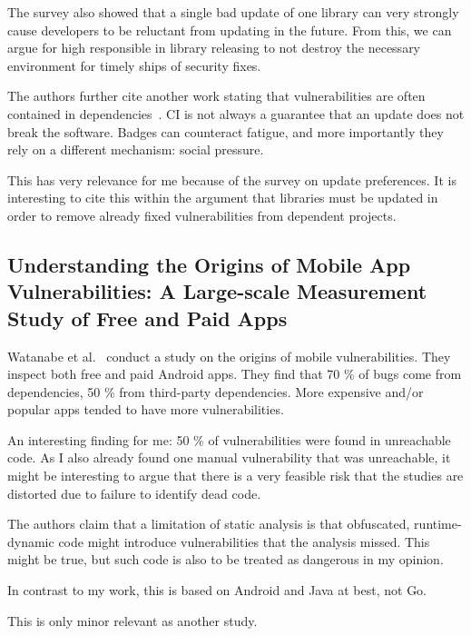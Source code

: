 The survey also showed that a single bad update of one library can very strongly cause developers to be reluctant from
updating in the future.
From this, we can argue for high responsible in library releasing to not destroy the necessary environment for timely
ships of security fixes.

The authors further cite another work stating that vulnerabilities are often contained in dependencies~\cite{xia2014}.
CI is not always a guarantee that an update does not break the software.
Badges can counteract fatigue, and more importantly they rely on a different mechanism: social pressure.

This has very relevance for me because of the survey on update preferences.
It is interesting to cite this within the argument that libraries must be updated in order to remove already fixed
vulnerabilities from dependent projects.



\subsection{Understanding the Origins of Mobile App Vulnerabilities: A Large-scale Measurement Study of Free and Paid Apps}
\label{subsec:understanding-the-origins-of-mobile-app-vulnerabilities:-a-large-scale-measurement-study-of-free-and-paid-apps}

Watanabe et al.~\cite{watanabe2017} conduct a study on the origins of mobile vulnerabilities.
They inspect both free and paid Android apps.
They find that 70 \% of bugs come from dependencies, 50 \% from third-party dependencies.
More expensive and/or popular apps tended to have more vulnerabilities.

An interesting finding for me: 50 \% of vulnerabilities were found in unreachable code.
As I also already found one manual vulnerability that was unreachable, it might be interesting to argue that there is a
very feasible risk that the studies are distorted due to failure to identify dead code.

The authors claim that a limitation of static analysis is that obfuscated, runtime-dynamic code might introduce
vulnerabilities that the analysis missed.
This might be true, but such code is also to be treated as dangerous in my opinion.

In contrast to my work, this is based on Android and Java at best, not Go.

This is only minor relevant as another study.



